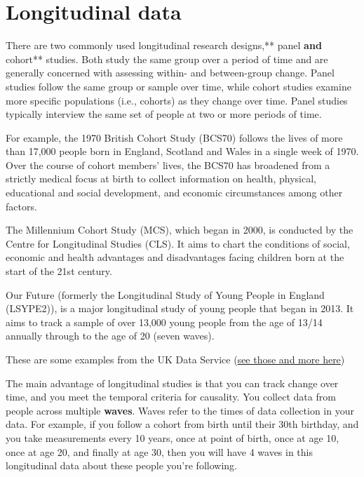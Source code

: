 \documentclass[]{book}
\theoremstyle{definition}
\theoremstyle{definition}
\theoremstyle{definition}
\theoremstyle{remark}
\begin{document}
\hypertarget{longitudinal-data}{%
\section{Longitudinal data}\label{longitudinal-data}}

There are two commonly used longitudinal research designs,** panel
\textbf{and }cohort** studies. Both study the same group over a period
of time and are generally concerned with assessing within- and
between-group change. Panel studies follow the same group or sample over
time, while cohort studies examine more specific populations (i.e.,
cohorts) as they change over time. Panel studies typically interview the
same set of people at two or more periods of time.

For example, the 1970 British Cohort Study (BCS70) follows the lives of
more than 17,000 people born in England, Scotland and Wales in a single
week of 1970. Over the course of cohort members' lives, the BCS70 has
broadened from a strictly medical focus at birth to collect information
on health, physical, educational and social development, and economic
circumstances among other factors.

The Millennium Cohort Study (MCS), which began in 2000, is conducted by
the Centre for Longitudinal Studies (CLS). It aims to chart the
conditions of social, economic and health advantages and disadvantages
facing children born at the start of the 21st century.

Our Future (formerly the Longitudinal Study of Young People in England
(LSYPE2)), is a major longitudinal study of young people that began in
2013. It aims to track a sample of over 13,000 young people from the age
of 13/14 annually through to the age of 20 (seven waves).

These are some examples from the UK Data Service
(\href{https://www.ukdataservice.ac.uk/get-data/key-data/cohort-and-longitudinal-studies}{see
those and more here})

The main advantage of longitudinal studies is that you can track change
over time, and you meet the temporal criteria for causality. You collect
data from people across multiple \textbf{waves}. Waves refer to the
times of data collection in your data. For example, if you follow a
cohort from birth until their 30th birthday, and you take measurements
every 10 years, once at point of birth, once at age 10, once at age 20,
and finally at age 30, then you will have 4 waves in this longitudinal
data about these people you're following.
\end{document}

